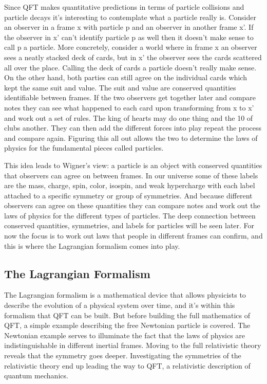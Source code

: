Since QFT makes quantitative predictions in terms of particle collisions and particle decays it's interesting to contemplate what a particle really is. Consider an observer in a frame x with particle p and an observer in another frame x'. If the observer in x' can't identify particle p as well then it doesn't make sense to call p a particle. More concretely, consider a world where in frame x an observer sees a neatly stacked deck of cards, but in x' the observer sees the cards scattered all over the place. Calling the deck of cards a particle doesn't really make sense. On the other hand, both parties can still agree on the individual cards which kept the same suit and value. The suit and value are conserved quantities identifiable between frames. If the two observers get together later and compare notes they can see what happened to each card upon transforming from x to x' and work out a set of rules. The king of hearts may do one thing and the 10 of clubs another. They can then add the different forces into play repeat the process and compare again. Figuring this all out allows the two to determine the laws of physics for the fundamental pieces called particles.       

This idea leads to Wigner's view: a particle is an object with conserved quantities that observers can agree on between frames. In our universe some of these labels are the mass, charge, spin, color, isospin, and weak hypercharge with each label attached to a specific symmetry or group of symmetries. And because different observers can agree on these quantities they can compare notes and work out the laws of physics for the different types of particles. The deep connection between conserved quantities, symmetries, and labels for particles will be seen later. For now the focus is to work out laws that people in different frames can confirm, and this is where the Lagrangian formalism comes into play. 

\subsection{The Lagrangian Formalism}

The Lagrangian formalism is a mathematical device that allows physicists to describe the evolution of a physical system over time, and it's within this formalism that QFT can be built. But before building the full mathematics of QFT, a simple example describing the free Newtonian particle is covered. The Newtonian example serves to illuminate the fact that the laws of physics are indistinguishable in different inertial frames. Moving to the full relativistic theory reveals that the symmetry goes deeper. Investigating the symmetries of the relativistic theory end up leading the way to QFT, a relativistic description of quantum mechanics.

